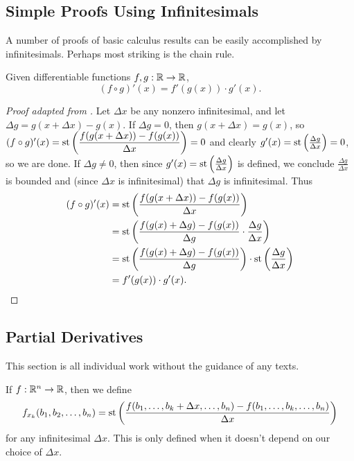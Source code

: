 \subsection{Simple Proofs Using Infinitesimals}
A number of proofs of basic calculus results can be easily accomplished by infinitesimals. Perhaps most striking is the chain rule.

\begin{thm}\label{ChainRule}
    Given differentiable functions $f, g: \mathbb{R} \to \mathbb{R}$, 
    \[(f \circ g)'(x) = f'(g(x)) \cdot g'(x).\]
\end{thm}

\begin{proof}[Proof adapted from ] 
    Let $\Delta x$ be any nonzero infinitesimal, and let $\Delta g = g(x + \Delta x) - g(x)$. If $\Delta g = 0$, then $g(x + \Delta x) = g(x)$, so $(f \circ g)'(x) = \operatorname{st}\left(\dfrac{f(g(x + \Delta x)) - f(g(x))}{\Delta x}\right) = 0$ and clearly $g'(x) = \operatorname{st}\left(\frac{\Delta g}{\Delta x}\right) = 0$, so we are done. If $\Delta g \neq 0$, then since $g'(x) = \operatorname{st}\left(\frac{\Delta g}{\Delta x}\right)$ is defined, we conclude $\frac{\Delta g}{\Delta x}$ is bounded and (since $\Delta x$ is infinitesimal) that $\Delta g$ is infinitesimal. Thus
\begin{align*}
    (f \circ g)'(x) &= \operatorname{st}\left(\frac{f(g(x + \Delta x)) - f(g(x))}{\Delta x}\right) \\
        &= \operatorname{st}\left(\frac{f(g(x) + \Delta g) - f(g(x))}{\Delta g} \cdot \frac{\Delta g}{\Delta x}\right) \\
        &= \operatorname{st}\left(\frac{f(g(x) + \Delta g) - f(g(x))}{\Delta g}\right) \cdot \operatorname{st}\left(\frac{\Delta g}{\Delta x}\right) \\
        &= f'(g(x)) \cdot g'(x).
\end{align*}
\end{proof}

\subsection{Partial Derivatives}
This section is all individual work without the guidance of any texts.

\begin{defn}
    If $f: \mathbb{R}^n \to \mathbb{R}$, then we define
    \[f_{x_k}(b_1, b_2, \ldots, b_n) = \operatorname{st}\left(\frac{f(b_1, \ldots, b_k + \Delta x, \ldots, b_n) - f(b_1, \ldots, b_k, \ldots, b_n)}{\Delta x}\right) \]
    for any infinitesimal $\Delta x$. This is only defined when it doesn't depend on our choice of $\Delta x$.
\end{defn}

